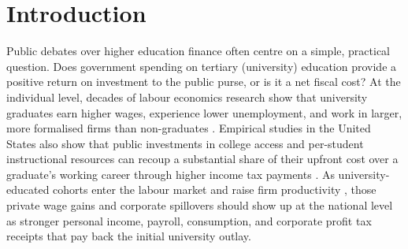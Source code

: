 \documentclass[11pt,a4paper]{article}
\begin{document}
\begin{abstract}
twelve-fold return in middle- and low-income economies, whereas expanding the overall university budget without protecting spending per student fails to generate a fiscal return.

\vspace{0.5em}
\noindent \textbf{Keywords:} Multivariate Bayesian Causal Forests; continuous treatment; tertiary education spending; fiscal return on investment; direct income taxation; cross-country panel data.
\end{abstract}

\section{Introduction}
\label{sec:intro}

Public debates over higher education finance often centre on a simple, practical question. Does government spending on tertiary (university) education provide a positive return on investment to the public purse, or is it a net fiscal cost? At the individual level, decades of labour economics research show that university graduates earn higher wages, experience lower unemployment, and work in larger, more formalised firms than non-graduates \citep{carneiro2011estimating, zimmerman2014returns, psacharopoulos2018returns, deming2022four}. Empirical studies in the United States also show that public investments in college access and per-student instructional resources can recoup a substantial share of their upfront cost over a graduate's working career through higher income tax payments \citep{trostel2010fiscal, chakrabarti2020state, hendren2020unified}. As university-educated cohorts enter the labour market and raise firm productivity \citep{moretti2004estimating, valero2019economic}, those private wage gains and corporate spillovers should show up at the national level as stronger personal income, payroll, consumption, and corporate profit tax receipts that pay back the initial university outlay.
\end{document}
